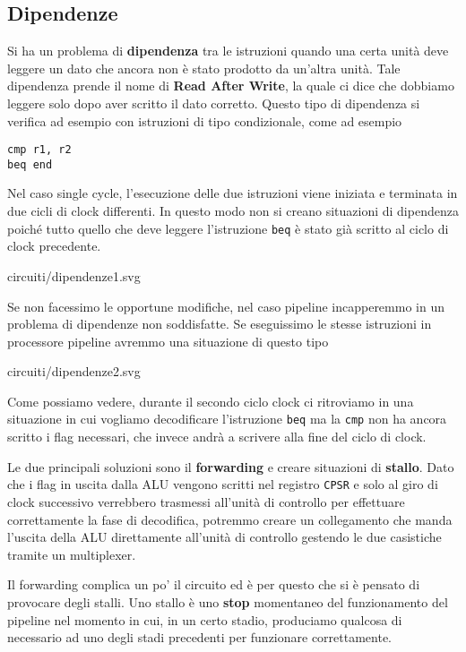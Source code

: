 \subsection{Dipendenze}
Si ha un problema di \textbf{dipendenza} tra le istruzioni quando una certa unità deve leggere un
dato che ancora non è stato prodotto da un'altra unità. Tale dipendenza prende il nome di
\textbf{Read After Write}, la quale ci dice che dobbiamo leggere solo dopo aver scritto il dato
corretto. Questo tipo di dipendenza si verifica ad esempio con istruzioni di tipo condizionale,
come ad esempio
\begin{verbatim}
cmp r1, r2
beq end
\end{verbatim}
Nel caso single cycle, l'esecuzione delle due istruzioni viene iniziata e terminata in due cicli di
clock differenti. In questo modo non si creano situazioni di dipendenza poiché tutto quello che
deve leggere l'istruzione \verb|beq| è stato già scritto al ciclo di clock precedente.
\begin{center}
	 {circuiti/dipendenze1.svg}
\end{center}
Se non facessimo le opportune modifiche, nel caso pipeline incapperemmo in un problema di
dipendenze non soddisfatte. Se eseguissimo le stesse istruzioni in processore pipeline avremmo una
situazione di questo tipo
\begin{center}
	 {circuiti/dipendenze2.svg}
\end{center}
Come possiamo vedere, durante il secondo ciclo clock ci ritroviamo in una situazione in cui
vogliamo decodificare l'istruzione \verb|beq| ma la \verb|cmp| non ha ancora scritto i flag
necessari, che invece andrà a scrivere alla fine del ciclo di clock.

Le due principali soluzioni sono il \textbf{forwarding} e creare situazioni di \textbf{stallo}.
Dato che i flag in uscita dalla ALU vengono scritti nel registro \verb|CPSR| e solo al giro di
clock successivo verrebbero trasmessi all'unità di controllo per effettuare correttamente la fase
di decodifica, potremmo creare un collegamento che manda l'uscita della ALU direttamente all'unità
di controllo gestendo le due casistiche tramite un multiplexer.

Il forwarding complica un po' il circuito ed è per questo che si è pensato di provocare degli
stalli. Uno stallo è uno \textbf{stop} momentaneo del funzionamento del pipeline nel momento in
cui, in un certo stadio, produciamo qualcosa di necessario ad uno degli stadi precedenti per
funzionare correttamente.

